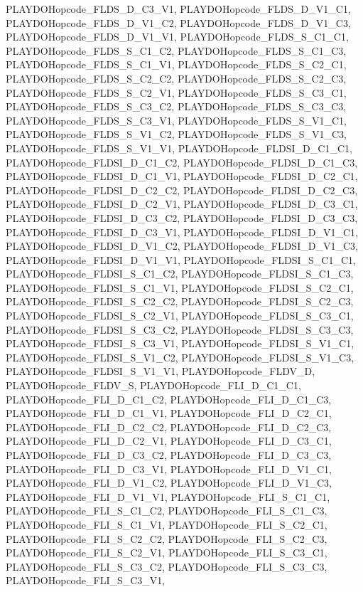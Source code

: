 PLAYDOHopcode\_\-FLDS\_\-D\_\-C3\_\-V1, PLAYDOHopcode\_\-FLDS\_\-D\_\-V1\_\-C1, PLAYDOHopcode\_\-FLDS\_\-D\_\-V1\_\-C2, PLAYDOHopcode\_\-FLDS\_\-D\_\-V1\_\-C3, PLAYDOHopcode\_\-FLDS\_\-D\_\-V1\_\-V1, PLAYDOHopcode\_\-FLDS\_\-S\_\-C1\_\-C1, PLAYDOHopcode\_\-FLDS\_\-S\_\-C1\_\-C2, PLAYDOHopcode\_\-FLDS\_\-S\_\-C1\_\-C3, PLAYDOHopcode\_\-FLDS\_\-S\_\-C1\_\-V1, PLAYDOHopcode\_\-FLDS\_\-S\_\-C2\_\-C1, PLAYDOHopcode\_\-FLDS\_\-S\_\-C2\_\-C2, PLAYDOHopcode\_\-FLDS\_\-S\_\-C2\_\-C3, PLAYDOHopcode\_\-FLDS\_\-S\_\-C2\_\-V1, PLAYDOHopcode\_\-FLDS\_\-S\_\-C3\_\-C1, PLAYDOHopcode\_\-FLDS\_\-S\_\-C3\_\-C2, PLAYDOHopcode\_\-FLDS\_\-S\_\-C3\_\-C3, PLAYDOHopcode\_\-FLDS\_\-S\_\-C3\_\-V1, PLAYDOHopcode\_\-FLDS\_\-S\_\-V1\_\-C1, PLAYDOHopcode\_\-FLDS\_\-S\_\-V1\_\-C2, PLAYDOHopcode\_\-FLDS\_\-S\_\-V1\_\-C3, PLAYDOHopcode\_\-FLDS\_\-S\_\-V1\_\-V1, PLAYDOHopcode\_\-FLDSI\_\-D\_\-C1\_\-C1, PLAYDOHopcode\_\-FLDSI\_\-D\_\-C1\_\-C2, PLAYDOHopcode\_\-FLDSI\_\-D\_\-C1\_\-C3, PLAYDOHopcode\_\-FLDSI\_\-D\_\-C1\_\-V1, PLAYDOHopcode\_\-FLDSI\_\-D\_\-C2\_\-C1, PLAYDOHopcode\_\-FLDSI\_\-D\_\-C2\_\-C2, PLAYDOHopcode\_\-FLDSI\_\-D\_\-C2\_\-C3, PLAYDOHopcode\_\-FLDSI\_\-D\_\-C2\_\-V1, PLAYDOHopcode\_\-FLDSI\_\-D\_\-C3\_\-C1, PLAYDOHopcode\_\-FLDSI\_\-D\_\-C3\_\-C2, PLAYDOHopcode\_\-FLDSI\_\-D\_\-C3\_\-C3, PLAYDOHopcode\_\-FLDSI\_\-D\_\-C3\_\-V1, PLAYDOHopcode\_\-FLDSI\_\-D\_\-V1\_\-C1, PLAYDOHopcode\_\-FLDSI\_\-D\_\-V1\_\-C2, PLAYDOHopcode\_\-FLDSI\_\-D\_\-V1\_\-C3, PLAYDOHopcode\_\-FLDSI\_\-D\_\-V1\_\-V1, PLAYDOHopcode\_\-FLDSI\_\-S\_\-C1\_\-C1, PLAYDOHopcode\_\-FLDSI\_\-S\_\-C1\_\-C2, PLAYDOHopcode\_\-FLDSI\_\-S\_\-C1\_\-C3, PLAYDOHopcode\_\-FLDSI\_\-S\_\-C1\_\-V1, PLAYDOHopcode\_\-FLDSI\_\-S\_\-C2\_\-C1, PLAYDOHopcode\_\-FLDSI\_\-S\_\-C2\_\-C2, PLAYDOHopcode\_\-FLDSI\_\-S\_\-C2\_\-C3, PLAYDOHopcode\_\-FLDSI\_\-S\_\-C2\_\-V1, PLAYDOHopcode\_\-FLDSI\_\-S\_\-C3\_\-C1, PLAYDOHopcode\_\-FLDSI\_\-S\_\-C3\_\-C2, PLAYDOHopcode\_\-FLDSI\_\-S\_\-C3\_\-C3, PLAYDOHopcode\_\-FLDSI\_\-S\_\-C3\_\-V1, PLAYDOHopcode\_\-FLDSI\_\-S\_\-V1\_\-C1, PLAYDOHopcode\_\-FLDSI\_\-S\_\-V1\_\-C2, PLAYDOHopcode\_\-FLDSI\_\-S\_\-V1\_\-C3, PLAYDOHopcode\_\-FLDSI\_\-S\_\-V1\_\-V1, PLAYDOHopcode\_\-FLDV\_\-D, PLAYDOHopcode\_\-FLDV\_\-S, PLAYDOHopcode\_\-FLI\_\-D\_\-C1\_\-C1, PLAYDOHopcode\_\-FLI\_\-D\_\-C1\_\-C2, PLAYDOHopcode\_\-FLI\_\-D\_\-C1\_\-C3, PLAYDOHopcode\_\-FLI\_\-D\_\-C1\_\-V1, PLAYDOHopcode\_\-FLI\_\-D\_\-C2\_\-C1, PLAYDOHopcode\_\-FLI\_\-D\_\-C2\_\-C2, PLAYDOHopcode\_\-FLI\_\-D\_\-C2\_\-C3, PLAYDOHopcode\_\-FLI\_\-D\_\-C2\_\-V1, PLAYDOHopcode\_\-FLI\_\-D\_\-C3\_\-C1, PLAYDOHopcode\_\-FLI\_\-D\_\-C3\_\-C2, PLAYDOHopcode\_\-FLI\_\-D\_\-C3\_\-C3, PLAYDOHopcode\_\-FLI\_\-D\_\-C3\_\-V1, PLAYDOHopcode\_\-FLI\_\-D\_\-V1\_\-C1, PLAYDOHopcode\_\-FLI\_\-D\_\-V1\_\-C2, PLAYDOHopcode\_\-FLI\_\-D\_\-V1\_\-C3, PLAYDOHopcode\_\-FLI\_\-D\_\-V1\_\-V1, PLAYDOHopcode\_\-FLI\_\-S\_\-C1\_\-C1, PLAYDOHopcode\_\-FLI\_\-S\_\-C1\_\-C2, PLAYDOHopcode\_\-FLI\_\-S\_\-C1\_\-C3, PLAYDOHopcode\_\-FLI\_\-S\_\-C1\_\-V1, PLAYDOHopcode\_\-FLI\_\-S\_\-C2\_\-C1, PLAYDOHopcode\_\-FLI\_\-S\_\-C2\_\-C2, PLAYDOHopcode\_\-FLI\_\-S\_\-C2\_\-C3, PLAYDOHopcode\_\-FLI\_\-S\_\-C2\_\-V1, PLAYDOHopcode\_\-FLI\_\-S\_\-C3\_\-C1, PLAYDOHopcode\_\-FLI\_\-S\_\-C3\_\-C2, PLAYDOHopcode\_\-FLI\_\-S\_\-C3\_\-C3, PLAYDOHopcode\_\-FLI\_\-S\_\-C3\_\-V1, 
